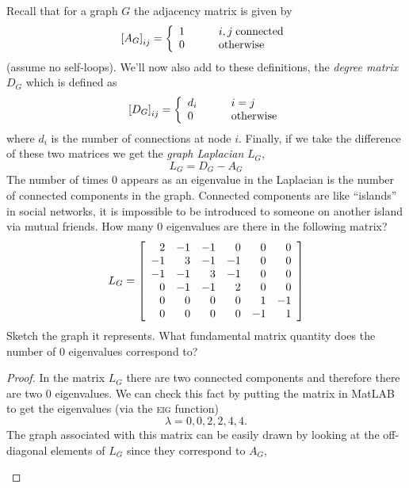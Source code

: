 \documentclass{tutorial}
\begin{document}
\begin{prob}
Recall that for a graph $G$ the adjacency matrix is given by
\[
  \ls A_G \rs_{ij} = \lb \begin{array}{lcl}
    1 & \hspace{0.15in} & i,j \; \text{connected} \\
    0 & & \text{otherwise}
  \end{array} \right. 
\]
(assume no self-loops). We'll now also add to these definitions, the \emph{degree matrix} $D_G$ which is defined as
\[
  \ls D_G \rs_{ij} = \lb \begin{array}{lcl}
    d_i & \hspace{0.15in} & i=j \\
    0 & & \text{otherwise}
  \end{array} \right.
\]
where $d_i$ is the number of connections at node $i$. Finally, if we take the difference of these two matrices we get the \emph{graph Laplacian} $L_G$,
\[
  L_G = D_G - A_G
\]
The number of times $0$ appears as an eigenvalue in the Laplacian is the number of connected components in the graph. Connected components are like ``islands'' in social networks, it is impossible to be introduced to someone on another island via mutual friends. How many $0$ eigenvalues are there in the following matrix?
\[
  L_G = \ls \begin{array}{rrrrrr}
     2 & -1 & -1 &  0 &  0 &  0 \\
    -1 &  3 & -1 & -1 &  0 &  0 \\
    -1 & -1 &  3 & -1 &  0 &  0 \\
     0 & -1 & -1 &  2 &  0 &  0 \\
     0 &  0 &  0 &  0 &  1 & -1 \\
     0 &  0 &  0 &  0 & -1 &  1
  \end{array} \rs
\]
Sketch the graph it represents. What fundamental matrix quantity does the number of $0$ eigenvalues correspond to?
\end{prob} \ifsolns \begin{proof}
In the matrix $L_G$ there are two connected components and therefore there are two $0$ eigenvalues. We can check this fact by putting the matrix in MatLAB to get the eigenvalues (via the \textsc{eig} function)
\[
  \lambda = 0,0,2,2,4,4 .
\]
The graph associated with this matrix can be easily drawn by looking at the off-diagonal elements of $L_G$ since they correspond to $A_G$,
\begin{center} \begin{tikzpicture}[scale=1,transform shape]

\end{tikzpicture}
\end{center}
\end{proof}
\end{document}
